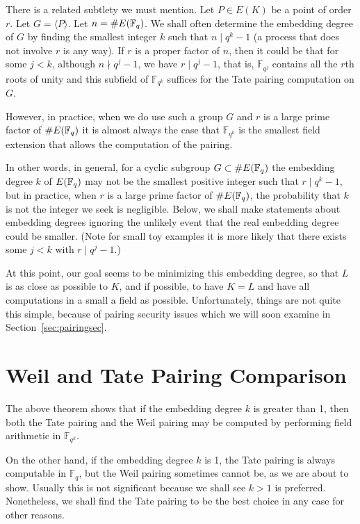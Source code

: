 There is a related subtlety we must mention.
Let $P \in E(K)$ be a point of order $r$.
Let $G = \langle P \rangle$.
Let $n = \#E(\mathbb{F}_q)$.
We shall often determine the embedding degree of $G$
by finding the smallest integer $k$ such that $n \mid q^k - 1$
(a process that does not involve $r$ is any way).
If $r$ is a proper factor of $n$,
then it could be that for some $j < k$, although $n \nmid q^j - 1$,
we have $r \mid q^j - 1$, that is,
$\mathbb{F}_{q^j}$ contains all the $r$th roots of unity and this
subfield of $\mathbb{F}_{q^k}$ suffices for
the Tate pairing computation on $G$.

However, in practice, when we do use such a group $G$ and
$r$ is a large prime factor of $\#E(\mathbb{F}_q)$ it is almost always the case that
$\mathbb{F}_{q^k}$ is the smallest field extension that allows the computation
of the pairing.

In other words, in general, for a cyclic subgroup $G \subset \#E(\mathbb{F}_q)$
the embedding degree $k$ of $E(\mathbb{F}_q)$
may not be the smallest positive integer such that $r \mid q^k - 1$,
but in practice, when $r$ is a large prime factor of $\#E(\mathbb{F}_q)$,
the probability that $k$ is not the integer we seek is negligible.
Below, we shall make statements
about embedding degrees ignoring the unlikely event that the
real embedding degree could be smaller.
(Note for small toy examples it is more likely that there exists
some $j < k$ with $r \mid q^j - 1$.)

At this point, our goal seems to be minimizing this embedding degree,
so that $L$ is as close as possible to $K$, and if possible,
to have $K = L$ and have all computations in a
small a field as possible.
Unfortunately, things are not quite this simple, because of
pairing security issues which we will soon examine in
Section~\ref{sec:pairingsec}.

\section {Weil and Tate Pairing Comparison}

The above theorem shows that if the embedding degree $k$ is greater than 1,
then both the Tate pairing and the Weil pairing may be computed by
performing field arithmetic in $\mathbb{F}_{q^k}$.

On the other hand, if the embedding degree $k$ is 1, the Tate pairing is always
computable in $\mathbb{F}_q$, but the Weil pairing sometimes cannot be,
as we are about to show.
Usually this is not significant because we shall see
$k > 1$ is preferred.
Nonetheless, we shall find the Tate pairing to be the best choice in
any case for other reasons.

